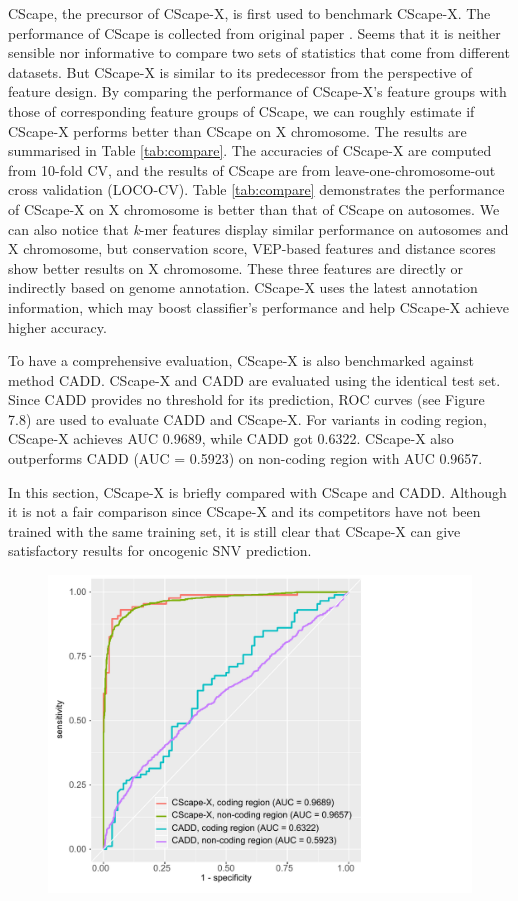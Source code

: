 \documentclass[a4paper,nohyper,nobib,openany,justified]{tufte-book}
\begin{document}
\begin{fullwidth}
CScape, the precursor of CScape-X, is first used to benchmark CScape-X. The performance of CScape is collected from original paper \cite{Rogers2017}. Seems that it is neither sensible nor informative to compare two sets of statistics that come from different datasets. But CScape-X is similar to its predecessor from the perspective of feature design. By comparing the performance of CScape-X's feature groups with those of corresponding feature groups of CScape, we can roughly estimate if CScape-X performs better than CScape on X chromosome. The results are summarised in Table \ref{tab:compare}. The accuracies of CScape-X are computed from 10-fold CV, and the results of CScape are from leave-one-chromosome-out cross validation (LOCO-CV). Table \ref{tab:compare} demonstrates the performance of CScape-X on X chromosome is better than that of CScape on autosomes. We can also notice that \emph{k}-mer features display similar performance on autosomes and X chromosome, but conservation score, VEP-based features and distance scores show better results on X chromosome. These three features are directly or indirectly based on genome annotation. CScape-X uses the latest annotation information, which may boost classifier's performance and help CScape-X achieve higher accuracy.

To have a comprehensive evaluation, CScape-X is also benchmarked against method CADD. CScape-X and CADD are evaluated using the identical test set. Since CADD provides no threshold for its prediction, ROC curves (see Figure 7.8) are used to evaluate CADD and CScape-X. For variants in coding region, CScape-X achieves AUC 0.9689, while CADD got 0.6322. CScape-X also outperforms CADD (AUC = 0.5923) on non-coding region with AUC 0.9657.

In this section, CScape-X is briefly compared with CScape and CADD. Although it is not a fair comparison since CScape-X and its competitors have not been trained with the same training set, it is still clear that CScape-X can give satisfactory results for oncogenic SNV prediction.

\begin{figure}[t!]
\centering
  \includegraphics[width=0.75\linewidth]{ROC_CADD.pdf}%


\end{figure}
\end{fullwidth}
\end{document}
